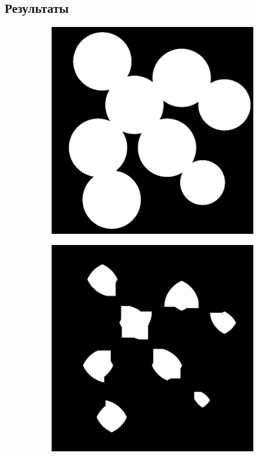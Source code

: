 \subsection{Результаты}
\vspace{3cm}
\begin{figure}[ht!]
    \centering
    \begin{subfigure}{0.4\textwidth}
        \centering
        \includegraphics[width=\textwidth]{images/transformed_images/2/binary_inv.jpg}
        \caption{}
        \label{img:bin_inv}
    \end{subfigure}
    \begin{subfigure}{0.4\textwidth}
        \centering
        \includegraphics[width=\textwidth]{images/transformed_images/2/erosed.jpg}

\end{subfigure}
\end{figure}
